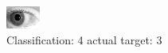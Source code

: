 \begin{figure}[h!]
\begin{center}
\includegraphics[width=0.60\columnwidth]{figures/ID335_class_4_target_3.png}
\end{center}
\caption{ Classification: 4 actual target: 3}
\label{fig:ID335_class_4_target_3}
\end{figure}
